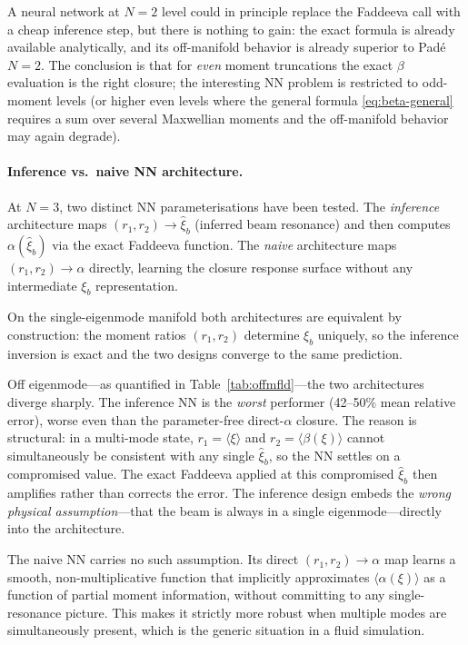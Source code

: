 \documentclass[11pt]{article}
\newcommand{\xib}{\xi_b}
\begin{document}
A neural network at $N=2$ level could in principle replace the Faddeeva
call with a cheap inference step, but there is nothing to gain: the exact
formula is already available analytically, and its off-manifold behavior
is already superior to Pad\'{e} $N=2$.  The conclusion is that for
\emph{even} moment truncations the exact $\beta$ evaluation is the right
closure; the interesting NN problem is restricted to odd-moment levels
(or higher even levels where the general formula \eqref{eq:beta-general}
requires a sum over several Maxwellian moments and the off-manifold
behavior may again degrade).

\paragraph{Inference vs.\ naive NN architecture.}
At $N=3$, two distinct NN parameterisations have been tested.  The
\emph{inference} architecture maps $(r_1, r_2) \to \hat\xi_b$ (inferred
beam resonance) and then computes $\alpha(\hat\xi_b)$ via the exact
Faddeeva function.  The \emph{naive} architecture maps $(r_1, r_2) \to
\alpha$ directly, learning the closure response surface without any
intermediate $\xib$ representation.

On the single-eigenmode manifold both architectures are equivalent by
construction: the moment ratios $(r_1, r_2)$ determine $\xib$ uniquely,
so the inference inversion is exact and the two designs converge to the
same prediction.

Off eigenmode---as quantified in Table~\ref{tab:offmfld}---the two
architectures diverge sharply.  The inference NN is the \emph{worst}
performer (42--50\% mean relative error), worse even than the parameter-free
direct-$\alpha$ closure.  The reason is structural: in a multi-mode state,
$r_1 = \langle\xi\rangle$ and $r_2 = \langle\beta(\xi)\rangle$ cannot
simultaneously be consistent with any single $\hat\xi_b$, so the NN
settles on a compromised value.  The exact Faddeeva applied at this
compromised $\hat\xi_b$ then amplifies rather than corrects the error.
The inference design embeds the \emph{wrong physical assumption}---that
the beam is always in a single eigenmode---directly into the architecture.

The naive NN carries no such assumption.  Its direct $(r_1, r_2) \to
\alpha$ map learns a smooth, non-multiplicative function that implicitly
approximates $\langle\alpha(\xi)\rangle$ as a function of partial moment
information, without committing to any single-resonance picture.  This
makes it strictly more robust when multiple modes are simultaneously
present, which is the generic situation in a fluid simulation.
\end{document}
